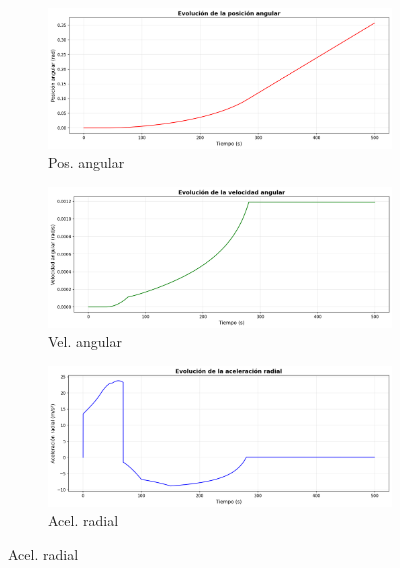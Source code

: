 \documentclass[10pt,a4paper]{article}
\begin{document}
\begin{figure}[H]
\centering
\begin{subfigure}{0.32\textwidth}
    \includegraphics[width=\textwidth]{../graficos/07_posicion_angular.png}
    \caption{\footnotesize Pos. angular}
\end{subfigure}
\hfill
\begin{subfigure}{0.32\textwidth}
    \includegraphics[width=\textwidth]{../graficos/06_velocidad_angular.png}
    \caption{\footnotesize Vel. angular}
\end{subfigure}
\hfill
\begin{subfigure}{0.32\textwidth}
    \includegraphics[width=\textwidth]{../graficos/01_aceleracion_radial.png}
    \caption{\footnotesize Acel. radial}
\end{subfigure}

\vspace{0.1cm}


\end{figure}
\end{document}

